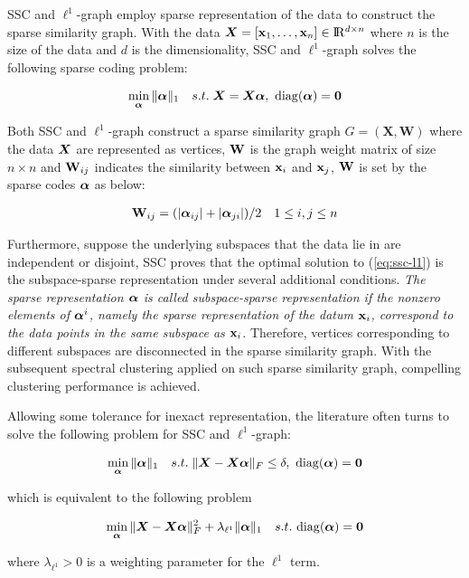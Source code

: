 \documentclass[10pt,twocolumn,letterpaper]{article}
\begin{document}
SSC \cite{ElhamifarV13} and $\ell^{1}$-graph \cite{YanW09,ChengYYFH10} employ sparse representation of the data to construct the sparse similarity graph. With the data ${\bm X}=[ {{\mathbf{x}_1},\ldots ,{\mathbf{x}_n}} ] \in {{\rm I}\kern-0.18em{\rm R}^{d \times n}}$ where $n$ is the size of the data and $d$ is the dimensionality, SSC and $\ell^{1}$-graph solves the following sparse coding problem:
\begin{small}\begin{align}\label{eq:ssc-l1}
\mathop {\min }\limits_{{\bm{\alpha}}} {\| {{\bm{\alpha}}} \|_1}\quad s.t.\;{\bm X} = {{\bm X}}{\bm{\alpha}},\,\, {\rm diag}(\bm{\alpha}) = \mathbf 0
\end{align}\end{small}
Both SSC and $\ell^{1}$-graph construct a sparse similarity graph $G = ( {{\bm X},{\mathbf W}} )$ where the data ${\bm X}$ are represented as vertices, ${\mathbf{W}}$ is the graph weight matrix of size $n \times n$ and ${\mathbf{W}}_{ij}$ indicates the similarity between $\mathbf{x}_i$ and $\mathbf{x}_j$, ${\mathbf{W}}$ is set by the sparse codes $\bm{\alpha}$ as below:
\begin{small}\begin{align}\label{eq:W}
{{\mathbf{W}}_{ij}}=({|{\bm{\alpha}_{ij}}|+|{\bm{\alpha}_{ji}}|})/{2} \quad 1 \le i,j \le n
\end{align}\end{small}
Furthermore, suppose the underlying subspaces that the data lie in are independent or disjoint, SSC \cite{ElhamifarV13} proves that the optimal solution to (\ref{eq:ssc-l1}) is the subspace-sparse representation under several additional conditions. \textit{The sparse representation $\bm{\alpha}$ is called subspace-sparse representation if the nonzero elements of $\bm{\alpha}^i$, namely the sparse representation of the datum $\mathbf{x}_i$,  correspond to the data points in the same subspace as $\mathbf{x}_i$}. Therefore, vertices corresponding to different subspaces are disconnected in the sparse similarity graph. With the subsequent spectral clustering \cite{Ng01} applied on such sparse similarity graph, compelling clustering performance is achieved.

Allowing some tolerance for inexact representation, the literature often turns to solve the following problem for SSC and $\ell^{1}$-graph:
\begin{small}\begin{align*}
\mathop {\min }\limits_{{\bm{\alpha}}} {\| {{\bm{\alpha}}} \|_1}\quad s.t.\;\|{\bm X} - {{\bm X}}{\bm{\alpha}}\|_F \le \delta,\,\, {\rm diag}(\bm{\alpha}) = \mathbf 0
\end{align*}\end{small}
which is equivalent to the following problem
\begin{small}\begin{align}\label{eq:ssc-l1-lasso}
\mathop {\min }\limits_{{\bm{\alpha}}} {\|\bm X - \bm X \bm{\alpha}\|_F^2 + {\lambda_{\ell^{1}}}\|{\bm{\alpha}}\|_1} \quad s.t. \,\, {\rm diag}(\bm{\alpha}) = \mathbf 0
\end{align}\end{small}
where ${\lambda_{\ell^{1}}}>0$ is a weighting parameter for the $\ell^{1}$ term.
\end{document}
